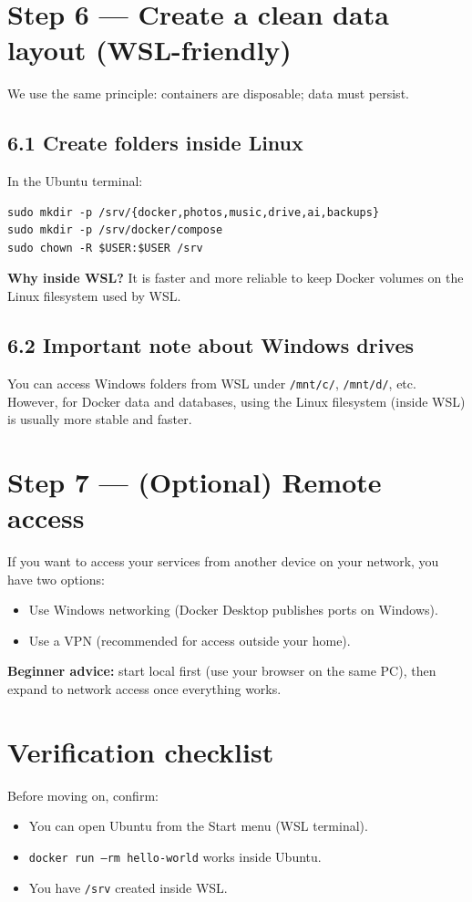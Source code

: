 
\section{Step 6 --- Create a clean data layout (WSL-friendly)}
We use the same principle: containers are disposable; data must persist.

\subsection{6.1 Create folders inside Linux}
In the Ubuntu terminal:
\begin{lstlisting}
sudo mkdir -p /srv/{docker,photos,music,drive,ai,backups}
sudo mkdir -p /srv/docker/compose
sudo chown -R $USER:$USER /srv
\end{lstlisting}

\textbf{Why inside WSL?} It is faster and more reliable to keep Docker volumes on the Linux filesystem used by WSL.

\subsection{6.2 Important note about Windows drives}
You can access Windows folders from WSL under \texttt{/mnt/c/}, \texttt{/mnt/d/}, etc.
However, for Docker data and databases, using the Linux filesystem (inside WSL) is usually more stable and faster.

\section{Step 7 --- (Optional) Remote access}
If you want to access your services from another device on your network, you have two options:
\begin{itemize}[leftmargin=*]
  \item Use Windows networking (Docker Desktop publishes ports on Windows).
  \item Use a VPN (recommended for access outside your home).
\end{itemize}

\textbf{Beginner advice:} start local first (use your browser on the same PC), then expand to network access once everything works.

\section{Verification checklist}
Before moving on, confirm:
\begin{itemize}[leftmargin=*]
  \item You can open Ubuntu from the Start menu (WSL terminal).
  \item \texttt{docker run --rm hello-world} works inside Ubuntu.
  \item You have \texttt{/srv} created inside WSL.
\end{itemize}

